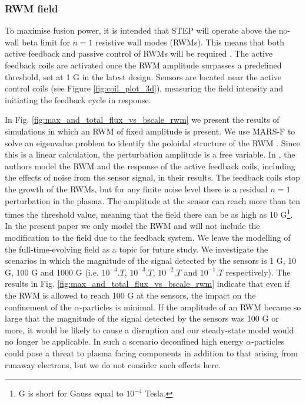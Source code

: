 \documentclass[10pt, a4paper, twoside]{article}
\begin{document}
\subsubsection{RWM field}
\label{sec:rwm_field}

To maximise fusion power, it is intended that STEP will operate above the no-wall beta limit for $n=1$ resistive wall modes (RWMs). This means that both active feedback and passive control of RWMs will be required \cite{xia2023}. The active feedback coils are activated once the RWM amplitude surpasses a predefined threshold, set at 1 G in the latest design.
Sensors are located near the active control coils (see Figure \ref{fig:coil_plot_3d}), measuring the field intensity and initiating the feedback cycle in response.

In Fig. \ref{fig:max_and_total_flux_vs_bscale_rwm} we present the results of simulations in which an RWM of fixed amplitude is present. 
We use MARS-F to solve an eigenvalue problem to identify the poloidal structure of the RWM \cite{xia2023}. Since this is a linear calculation, the perturbation amplitude is a free variable.
In \cite{xia2023}, the authors model the RWM and the response of the active feedback coils, including the effects of noise from the sensor signal, in their results. The feedback coils stop the growth of the RWMs, but for any finite noise level there is a residual $n=1$ perturbation in the plasma. The amplitude at the sensor can reach more than ten times the threshold value, meaning that the field there can be as high as 10 G\footnote{G is short for Gauss equal to $10^{-4}$ Tesla.}. In the present paper we only model the RWM and will not include the modification to the field due to the feedback system. We leave the modelling of the full-time-evolving field as a topic for future study. We investigate the scenarios in which the magnitude of the signal detected by the sensors is 1 G, 10 G, 100 G and 1000 G (i.e. $\si{10^{-4}.T}$, $\si{10^{-3}.T}$, $\si{10^{-2}.T}$ and $\si{10^{-1}.T}$ respectively). The results in Fig. \ref{fig:max_and_total_flux_vs_bscale_rwm} indicate that even if the RWM is allowed to reach 100 G at the sensors, the impact on the confinement of the $\alpha$-particles is minimal. If the amplitude of an RWM became so large that the magnitude of the signal detected by the sensors was 100 G or more, it would be likely to cause a disruption and our steady-state model would no longer be applicable. In such a scenario deconfined high energy $\alpha$-particles could pose a threat to plasma facing components in addition to that arising from runaway electrons, but we do not consider such effects here. 
\end{document}
